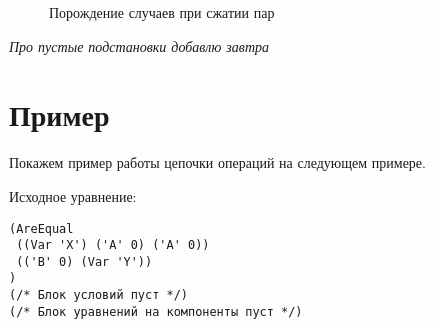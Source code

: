 \documentclass[12pt]{article}
\begin{document}
\begin{figure}[!htb]
{
}
\caption{Порождение случаев при сжатии пар}
\label{fig::test2}
\end{figure}
 
 \medskip
\emph{Про пустые подстановки добавлю завтра} 
 
\section{Пример}

Покажем пример работы цепочки операций на следующем примере.

Исходное уравнение: 

\begin{verbatim}
(AreEqual 
 ((Var 'X') ('A' 0) ('A' 0)) 
 (('B' 0) (Var 'Y'))
)
(/* Блок условий пуст */)
(/* Блок уравнений на компоненты пуст */)
\end{verbatim}
\end{document}
